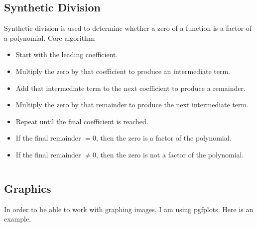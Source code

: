 \subsection{Synthetic Division}
    Synthetic division is used to determine whether a zero of a function
    is a factor of a polynomial.
    Core algorithm:
    \begin{itemize}
        \item Start with the leading coefficient.
        \item Multiply the zero by that coefficient to produce an intermediate term. 
        \item Add that intermediate term to the next coefficient to produce a remainder.
        \item Multiply the zero by that remainder to produce the next intermediate term.
        \item Repeat until the final coefficient is reached.
        \item If the final remainder $= 0$, then the zero is a factor of the polynomial.
        \item If the final remainder $\neq 0$, then the zero is not a factor of the polynomial.
    \end{itemize}
    \newpage
    \inputminted[linenos, breaklines]{python}{001/synthetic_division.py}
    \newpage

\subsection{Graphics}
    In order to be able to work with graphing images, I am using pgfplots. Here is an example.

